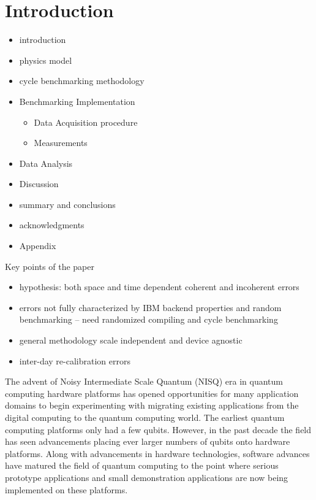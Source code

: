 \documentclass[main.tex]{subfiles}
\begin{document}
\section{Introduction}
\label{sec:intro}

\begin{itemize}
    \item introduction
\item physics model
\item cycle benchmarking methodology
\item Benchmarking Implementation
\begin{itemize}
    \item Data Acquisition procedure
    \item Measurements
\end{itemize}
\item Data Analysis
\item Discussion
\item summary and conclusions
\item acknowledgments
\item Appendix
\end{itemize}



Key points of the paper
\begin{itemize}
\item hypothesis: both space and time dependent coherent and incoherent errors
\item 	errors not fully characterized by IBM backend properties and random benchmarking – need randomized compiling and cycle benchmarking
\item  general methodology scale independent and device agnostic
\item inter-day re-calibration errors 
\end{itemize}

The advent of Noisy Intermediate Scale Quantum (NISQ) era in quantum computing hardware platforms has opened opportunities for many application domains to begin experimenting with migrating existing applications from the digital computing to the quantum computing world.  The earliest quantum computing platforms only had a few qubits.  However, in the past decade the field has seen advancements placing ever larger numbers of qubits onto hardware platforms.  Along with advancements in hardware technologies, software advances have matured the field of quantum computing to the point where serious prototype applications and small demonstration applications are now being implemented on these platforms.  
\end{document}
